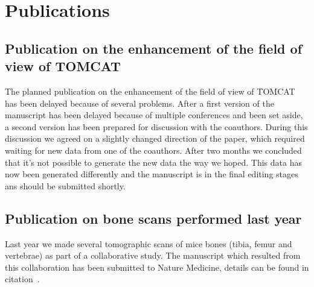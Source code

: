 \documentclass[a4paper,twoside,DIV=calc]{scrartcl}
\begin{document}
\section{Publications}\label{sec:publications}
\subsection{Publication on the enhancement of the field of view of TOMCAT}
The planned publication on the enhancement of the field of view of TOMCAT has been delayed because of several problems. After a first version of the manuscript has been delayed because of multiple conferences and been set aside, a second version has been prepared for discussion with the coauthors. During this discussion we agreed on a slightly changed direction of the paper, which required waiting for new data from one of the coauthors. After two months we concluded that it's not possible to generate the new data the way we hoped. This data has now been generated differently and the manuscript is in the final editing stages ans should be submitted shortly.

\subsection{Publication on bone scans performed last year}
Last year we made several tomographic scans of mice bones (tibia, femur and vertebrae) as part of a collaborative study. The manuscript which resulted from this collaboration has been submitted to Nature Medicine, details can be found in citation~\cite{Sausbier2009b}.



\end{document}
